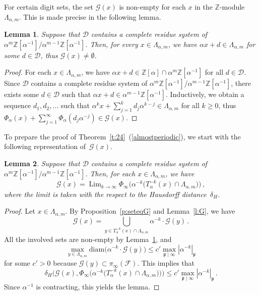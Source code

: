 \documentclass[12pt]{amsart}
\newtheorem{lemma}{Lemma}[section]
\theoremstyle{definition}
\theoremstyle{remark}
\numberwithin{equation}{section}
\begin{document}
For certain digit sets, the set $\mathcal{G}(x)$ is non-empty for each $x$ in the $\mathbb{Z}$-module~$\Lambda_{\alpha,m}$. 
This is made precise in the following lemma.

\begin{lemma} \label{l:continuation}
Suppose that $\mathcal{D}$ contains a complete residue system of $\alpha^m \mathbb{Z}[\alpha^{-1}] / \alpha^{m-1} \mathbb{Z}[\alpha^{-1}]$.
Then, for every $x \in \Lambda_{\alpha,m}$, we have $\alpha x + d \in \Lambda_{\alpha,m}$ for some $d \in \mathcal{D}$, thus $\mathcal{G}(x) \neq \emptyset$.
\end{lemma}

\begin{proof}
For each $x \in \Lambda_{\alpha,m}$, we have $\alpha x + d \in \mathbb{Z}[\alpha] \cap \alpha^m \mathbb{Z}[\alpha^{-1}]$ for all $d \in \mathcal{D}$.
Since $\mathcal{D}$ contains a complete residue system of $\alpha^m \mathbb{Z}[\alpha^{-1}] / \alpha^{m-1} \mathbb{Z}[\alpha^{-1}]$, there exists some $d \in \mathcal{D}$ such that $\alpha x + d \in \alpha^{m-1} \mathbb{Z}[\alpha^{-1}]$.
Inductively, we obtain a sequence $d_1, d_2, \ldots$ such that $\alpha^k x + \sum_{j=1}^k d_j \alpha^{k-j} \in \Lambda_{\alpha,m}$ for all $k\ge 0$, thus $\Phi_\alpha(x) + \sum_{j=1}^\infty \Phi_\alpha(d_j \alpha^{-j}) \in \mathcal{G}(x)$.
\end{proof}

To prepare the proof of Theorem~\ref{t:24}~(\ref{almostperiodic}), we start with the following representation of~$\mathcal{G}(x)$.

\begin{lemma} \label{l:GLim}
Suppose that $\mathcal{D}$ contains a complete residue system of $\alpha^m \mathbb{Z}[\alpha^{-1}] / \alpha^{m-1} \mathbb{Z}[\alpha^{-1}]$.
Then, for each $x \in \Lambda_{\alpha,m}$, we have
\[
\mathcal{G}(x) = \mathop{\mathrm{Lim}}_{k\to\infty} \Phi_\infty\big(\alpha^{-k} \big(T_\alpha^{-k}(x) \cap \Lambda_{\alpha,m}\big)\big)\,,
\]
where the limit is taken with the respect to the Hausdorff distance~$\delta_H$.
\end{lemma}

\begin{proof}
Let $x \in \Lambda_{\alpha,m}$.
By Proposition~\ref{p:seteqG} and Lemma~\ref{l:G}, we have
\[
\mathcal{G}(x) = \bigcup_{y \in T_\alpha^{-k}(x) \cap \Lambda_{\alpha,m}} \alpha^{-k} \cdot \mathcal{G}(y)\,.
\]
All the involved sets are non-empty by Lemma~\ref{l:continuation}, and
\[
\max_{y \in \Lambda_{\alpha,m}} \mathrm{diam}\big(\alpha^{-k} \cdot \mathcal{G}(y)\big) \le c' \max_{\mathfrak{p}\mid\infty} |\alpha^{-k}|_\mathfrak{p}
\]
for some $c' > 0$ because $\mathcal{G}(y) \subset \pi_\infty(\mathcal{F})$.
This implies that
\begin{equation} \label{e:deltaH}
\delta_H\Big(\mathcal{G}(x), \Phi_\infty\big(\alpha^{-k} \big(T_\alpha^{-k}(x) \cap \Lambda_{\alpha,m}\big)\big)\Big) \le c' \max_{\mathfrak{p}\mid\infty} |\alpha^{-k}|_\mathfrak{p}\,.
\end{equation}
Since $\alpha^{-1}$ is contracting, this yields the lemma.
\end{proof}
\end{document}
